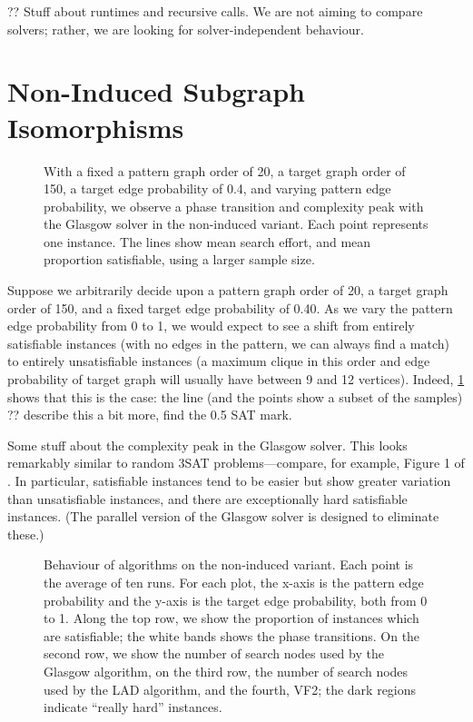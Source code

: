 \documentclass[letterpaper]{article}
\begin{document}
?? Stuff about runtimes and recursive calls. We are not aiming to compare solvers; rather, we are
looking for solver-independent behaviour.

\section{Non-Induced Subgraph Isomorphisms}

\begin{figure}[t]
    
    \caption{With a fixed a pattern graph order of 20, a target graph order of 150, a target edge
        probability of 0.4, and varying pattern edge probability, we observe a phase transition and
        complexity peak with the Glasgow solver in the non-induced variant. Each point represents
        one instance. The lines show mean search effort, and mean proportion satisfiable, using a
    larger sample size.}
    \label{figure:phase-transition}
\end{figure}

Suppose we arbitrarily decide upon a pattern graph order of 20, a target graph order of 150, and a
fixed target edge probability of 0.40. As we vary the pattern edge probability from 0 to 1, we would
expect to see a shift from entirely satisfiable instances (with no edges in the pattern, we can
always find a match) to entirely unsatisfiable instances (a maximum clique in this order and edge
probability of target graph will usually have between 9 and 12 vertices). Indeed,
\cref{figure:phase-transition} shows that this is the case: the line (and the points show a subset
of the samples) ?? describe this a bit more, find the 0.5 SAT mark.

Some stuff about the complexity peak in the Glasgow solver. This looks remarkably similar to random
3SAT problems---compare, for example, Figure 1 of \citet{LeytonBrown:2014}. In particular,
satisfiable instances tend to be easier but show greater variation than unsatisfiable instances, and
there are exceptionally hard satisfiable instances. (The parallel version of the Glasgow solver is
designed to eliminate these.)

\begin{figure}[tb]
    
    \caption{Behaviour of algorithms on the non-induced variant. Each point is the average of ten
        runs. For each plot, the x-axis is the pattern edge probability and the y-axis is the target
        edge probability, both from 0 to 1. Along the top row, we show the proportion of instances which are
        satisfiable; the white bands shows the phase transitions. On the second row, we show the
        number of search nodes used by the Glasgow algorithm, on the third row, the number of
        search nodes used by the LAD algorithm, and the fourth, VF2; the dark regions indicate
        ``really hard'' instances.}
    \label{figure:non-induced}
\end{figure}
\end{document}
